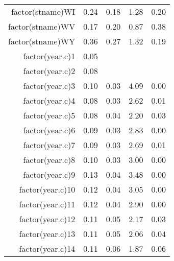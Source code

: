\begin{table}[ht]
\begin{tabular}{rrrrr}
  factor(stname)WI & 0.24 & 0.18 & 1.28 & 0.20 \\ 
  factor(stname)WV & 0.17 & 0.20 & 0.87 & 0.38 \\ 
  factor(stname)WY & 0.36 & 0.27 & 1.32 & 0.19 \\ 
  factor(year.c)1 & 0.05 &  &  &  \\ 
  factor(year.c)2 & 0.08 &  &  &  \\ 
  factor(year.c)3 & 0.10 & 0.03 & 4.09 & 0.00 \\ 
  factor(year.c)4 & 0.08 & 0.03 & 2.62 & 0.01 \\ 
  factor(year.c)5 & 0.08 & 0.04 & 2.20 & 0.03 \\ 
  factor(year.c)6 & 0.09 & 0.03 & 2.83 & 0.00 \\ 
  factor(year.c)7 & 0.09 & 0.03 & 2.69 & 0.01 \\ 
  factor(year.c)8 & 0.10 & 0.03 & 3.00 & 0.00 \\ 
  factor(year.c)9 & 0.13 & 0.04 & 3.48 & 0.00 \\ 
  factor(year.c)10 & 0.12 & 0.04 & 3.05 & 0.00 \\ 
  factor(year.c)11 & 0.12 & 0.04 & 2.90 & 0.00 \\ 
  factor(year.c)12 & 0.11 & 0.05 & 2.17 & 0.03 \\ 
  factor(year.c)13 & 0.11 & 0.05 & 2.06 & 0.04 \\ 
  factor(year.c)14 & 0.11 & 0.06 & 1.87 & 0.06 \\ 
   \hline
\end{tabular}
\end{table}
